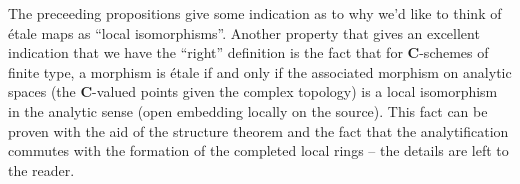 \noindent
The preceeding propositions give some indication as to why we'd like to think
of \'etale maps as ``local isomorphisms''. Another property that gives an
excellent indication that we have the ``right'' definition is the fact that
for $\mathbf{C}$-schemes of finite type, a morphism is \'etale if and only if 
the
associated morphism on analytic spaces (the $\mathbf{C}$-valued points given the
complex topology) is a local isomorphism in the analytic sense (open
embedding locally on the source). This fact can be proven with the aid of the
structure theorem and the fact that the analytification commutes with the
formation of the completed local rings -- the details are left to the reader.









